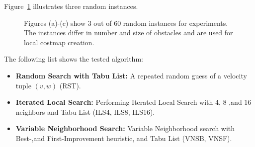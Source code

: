Figure~\ref{fig:fig_instances} illustrates three random instances. 
\begin{figure}[thpb]
     \footnotesize
      \centering
      \myfloatalign
      \setlength\fboxsep{0pt}
      \setlength\fboxrule{0.5pt}
       \caption{Figures (a)-(c) show 3 out of 60 random instances for experiments. The instances differ in number and size of obstacles and are used for local costmap creation.}
      \label{fig:fig_instances}
   \end{figure}

The following list shows the tested algorithm:
\begin{itemize}
\item{\bf{Random Search with Tabu List:}} A repeated random guess of a velocity tuple $(v,w)$ (RST).
\item{\bf{Iterated Local Search:}} Performing Iterated Local Search with 4, 8 ,and 16 neighbors and Tabu List (ILS4, ILS8, ILS16).
\item{\bf{Variable Neighborhood Search:}} Variable Neighborhood search with Best-,and First-Improvement heuristic, and Tabu List (VNSB, VNSF).
\end{itemize}

